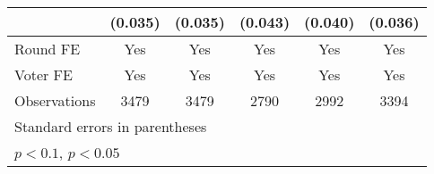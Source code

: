 \begin{table}[htbp]
\begin{tabular}{l*{5}{c}}
                    &     (0.035)       &     (0.035)       &     (0.043)       &     (0.040)       &     (0.036)       \\
[1em]
\hline  Round FE    &         Yes       &         Yes       &         Yes       &         Yes       &         Yes       \\
[1em]
Voter FE            &         Yes       &         Yes       &         Yes       &         Yes       &         Yes       \\
\hline
Observations        &        3479       &        3479       &        2790       &        2992       &        3394       \\
\hline\hline
\multicolumn{6}{l}{\footnotesize Standard errors in parentheses}\\
\multicolumn{6}{l}{\footnotesize \sym{+} \(p<0.1\), \sym{*} \(p<0.05\)}\\
\end{tabular}
\end{table}
